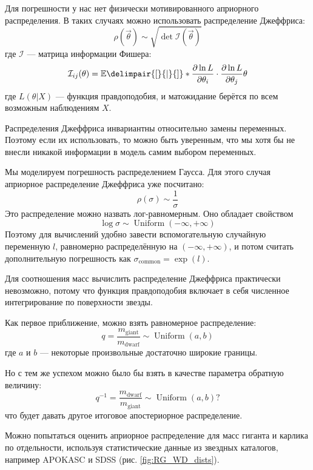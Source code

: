 
Для погрешности у нас нет физически мотивированного априорного распределения. В таких случаях можно использовать распределение Джеффриса:
\[
\rho(\vec \theta) \sim \sqrt{\det \mathcal I (\vec \theta)}
\]
где $\mathcal I$ --- матрица информации Фишера:
\[
\mathcal I_{ij}(\theta) = \mathbb E \delimpair{[}{|}{]}*{
\frac{\partial \ln L}{\partial \theta_i}
\cdot
\frac{\partial \ln L}{\partial \theta_j}
}{\theta}
\]
где $L(\theta | X)$ --- функция правдоподобия, и матожидание берётся по всем возможным наблюдениям $X$.

Распределения Джеффриса инвариантны относительно замены переменных. Поэтому если их использовать, то можно быть уверенным, что мы хотя бы не внесли никакой информации в модель самим выбором переменных.

Мы моделируем погрешность распределением Гаусса. Для этого случая априорное распределение Джеффриса уже посчитано:
\[
\rho(\sigma) \sim \frac{1}{\sigma}
\]
Это распределение можно назвать лог-равномерным. Оно обладает свойством
\[
\log \sigma \sim \operatorname{Uniform}(-\infty, +\infty)
\]
Поэтому для вычислений удобно завести вспомогательную случайную переменную $l$, равномерно распределённую на $(-\infty, +\infty)$, и потом считать дополнительную погрешность как $\sigma_\text{common} = \exp(l)$.


\label{sect:q_prior}

Для соотношения масс вычислить распределение Джеффриса практически невозможно, потому что функция правдоподобия включает в себя численное интегрирование по поверхности звезды.

Как первое приближение, можно взять равномерное распределение:
\[
q = \frac{m_\text{giant}}{m_\text{dwarf}} \sim \operatorname{Uniform}(a, b)
\]
где $a$ и $b$ --- некоторые произвольные достаточно широкие границы.

Но с тем же успехом можно было бы взять в качестве параметра обратную величину:
\[
q^{-1} = \frac{m_\text{dwarf}}{m_\text{giant}} \sim \operatorname{Uniform}(a, b)?
\]
что будет давать другое итоговое апостериорное распределение.

Можно попытаться оценить априорное распределение для масс гиганта и карлика по отдельности, используя статистические данные из звездных каталогов, например APOKASC \cite{APOKASC} и SDSS \cite{SDSS} (рис. \ref{fig:RG_WD_dists}).


